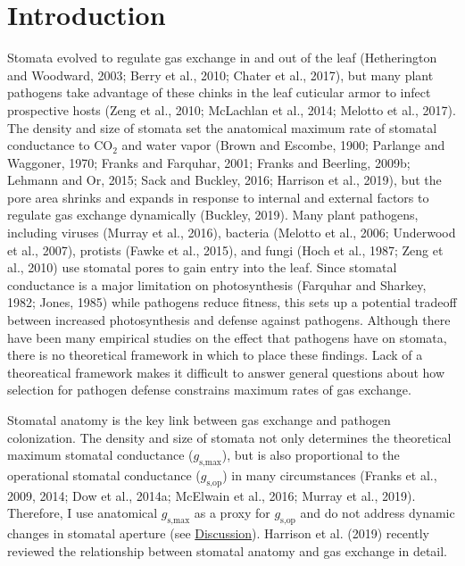 \documentclass[utf8]{frontiersSCNS}
\newcommand{\gsmax}{$g_\text{s,max}$}
\newcommand{\gsop}{$g_\text{s,op}$}
\begin{document}
\hypertarget{introduction}{%
\section*{Introduction}\label{introduction}}

Stomata evolved to regulate gas exchange in and out of the leaf
(Hetherington and Woodward, 2003; Berry et al., 2010; Chater et al.,
2017), but many plant pathogens take advantage of these chinks in the
leaf cuticular armor to infect prospective hosts (Zeng et al., 2010;
McLachlan et al., 2014; Melotto et al., 2017). The density and size of
stomata set the anatomical maximum rate of stomatal conductance to
CO\(_2\) and water vapor (Brown and Escombe, 1900; Parlange and
Waggoner, 1970; Franks and Farquhar, 2001; Franks and Beerling, 2009b;
Lehmann and Or, 2015; Sack and Buckley, 2016; Harrison et al., 2019),
but the pore area shrinks and expands in response to internal and
external factors to regulate gas exchange dynamically (Buckley, 2019).
Many plant pathogens, including viruses (Murray et al., 2016), bacteria
(Melotto et al., 2006; Underwood et al., 2007), protists (Fawke et al.,
2015), and fungi (Hoch et al., 1987; Zeng et al., 2010) use stomatal
pores to gain entry into the leaf. Since stomatal conductance is a major
limitation on photosynthesis (Farquhar and Sharkey, 1982; Jones, 1985)
while pathogens reduce fitness, this sets up a potential tradeoff
between increased photosynthesis and defense against pathogens. Although
there have been many empirical studies on the effect that pathogens have
on stomata, there is no theoretical framework in which to place these
findings. Lack of a theoreatical framework makes it difficult to answer
general questions about how selection for pathogen defense constrains
maximum rates of gas exchange.

Stomatal anatomy is the key link between gas exchange and pathogen
colonization. The density and size of stomata not only determines the
theoretical maximum stomatal conductance (\gsmax), but is also
proportional to the operational stomatal conductance (\gsop) in many
circumstances (Franks et al., 2009, 2014; Dow et al., 2014a; McElwain et
al., 2016; Murray et al., 2019). Therefore, I use anatomical \gsmax{} as
a proxy for \gsop{} and do not address dynamic changes in stomatal
aperture (see \protect\hyperlink{discussion}{Discussion}). Harrison et
al. (2019) recently reviewed the relationship between stomatal anatomy
and gas exchange in detail.
\end{document}
